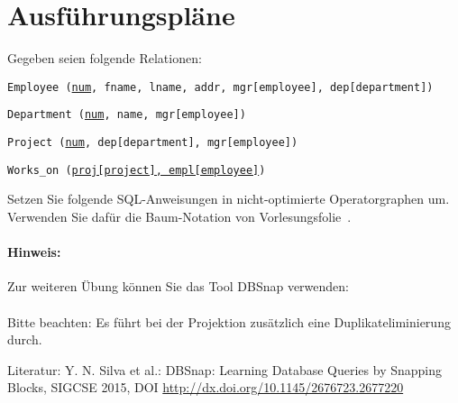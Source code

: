 \section{Ausführungspläne}
\label{plan}

Gegeben seien folgende Relationen:

\texttt{Employee (\underline{num}, fname, lname, addr, mgr[employee], \beamertxt{\\}dep[department])}

\texttt{Department (\underline{num}, name, mgr[employee])}

\texttt{Project (\underline{num}, dep[department], mgr[employee])}

\texttt{Works\_on (\underline{proj[project], empl[employee]})}

Setzen Sie folgende SQL-Anweisungen in nicht-optimierte Operatorgraphen um. Verwenden Sie dafür die Baum-Notation von Vorlesungsfolie~\Operatorgraph. %

\paragraph{Hinweis:} Zur weiteren Übung können Sie das Tool DBSnap verwenden: \\
	\DBSnap \\
	Bitte beachten: Es führt bei der Projektion zusätzlich eine Duplikateliminierung durch.

	\begin{note}
		Literatur: Y. N. Silva et al.: DBSnap: Learning Database Queries by Snapping Blocks, SIGCSE 2015, DOI \url{http://dx.doi.org/10.1145/2676723.2677220}
	\end{note}

